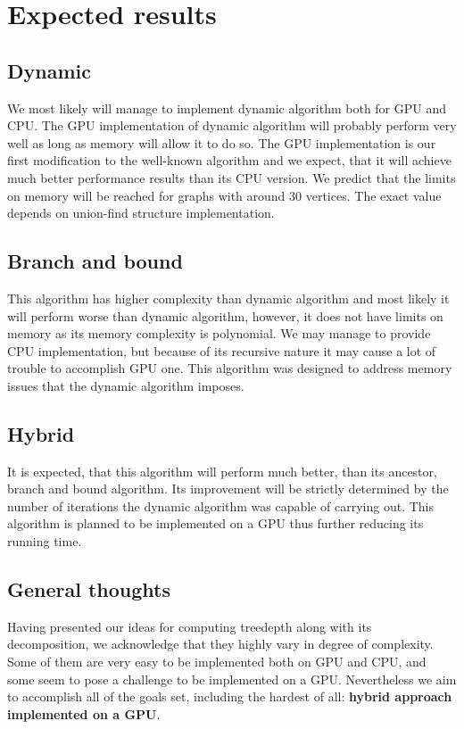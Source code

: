 \section{Expected results}

\subsection{Dynamic}
We most likely will manage to implement dynamic algorithm both for GPU and CPU. The GPU implementation of dynamic algorithm will probably perform very well as long as memory will allow it to do so. The GPU implementation is our first modification to the well-known algorithm and we expect, that it will achieve much better performance results than its CPU version. We predict that the limits on memory will be reached for graphs with around 30 vertices. The exact value depends on union-find structure implementation.

\subsection{Branch and bound}
This algorithm has higher complexity than dynamic algorithm and most likely it will perform worse than dynamic algorithm, however, it does not have limits on memory as its memory complexity is polynomial. We may manage to provide CPU implementation, but because of its recursive nature it may cause a lot of trouble to accomplish GPU one. This algorithm was designed to address memory issues that the dynamic algorithm imposes.

\subsection{Hybrid}
It is expected, that this algorithm will perform much better, than its ancestor, branch and bound algorithm. Its improvement will be strictly determined by the number of iterations the dynamic algorithm was capable of carrying out. This algorithm is planned to be implemented on a GPU thus further reducing its running time.

\subsection{General thoughts}
Having presented our ideas for computing treedepth along with its decomposition, we acknowledge that they highly vary in degree of complexity. Some of them are very easy to be implemented both on GPU and CPU, and some seem to pose a challenge to be implemented on a GPU. Nevertheless we aim to accomplish all of the goals set, including the hardest of all: \textbf{hybrid approach implemented on a GPU}.
